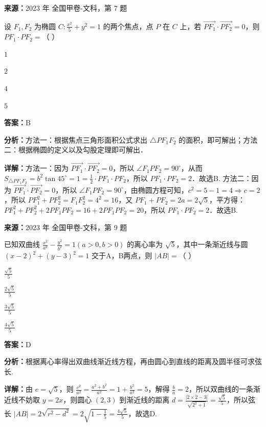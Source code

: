 \begin{question}[points=5]
\textbf{来源：}2023 年 全国甲卷-文科，第 7 题\par
设 $F_1, F_2$ 为椭圆 $C: \frac{x^2}{5}+y^2=1$ 的两个焦点，点 $P$ 在 $C$ 上，若 $\overrightarrow{PF_1} \cdot \overrightarrow{PF_2}=0$，则 $PF_1 \cdot PF_2 =$（    ）
\begin{choices}
  \item $1$
  \item $2$
  \item $4$
  \item $5$
\end{choices}
\begin{solution}
\textbf{答案：}B

\textbf{分析：}方法一：根据焦点三角形面积公式求出 $\triangle PF_1F_2$ 的面积，即可解出；方法二：根据椭圆的定义以及勾股定理即可解出．

\textbf{详解：}方法一：因为 $\overrightarrow{PF_1} \cdot \overrightarrow{PF_2}=0$，所以 $\angle F_1PF_2=90^\circ$，从而 $S_{\triangle PF_1F_2} = b^2\tan45^\circ = 1 = \frac{1}{2} \cdot PF_1 \cdot PF_2$，所以 $PF_1 \cdot PF_2 = 2$．故选B.
方法二：因为 $\overrightarrow{PF_1} \cdot \overrightarrow{PF_2}=0$，所以 $\angle F_1PF_2=90^\circ$，由椭圆方程可知，$c^2=5-1=4 \Rightarrow c=2$，所以 $PF_1^2+PF_2^2 = F_1F_2^2 = 4^2=16$，又 $PF_1+PF_2=2a=2\sqrt{5}$，平方得：$PF_1^2+PF_2^2+2PF_1PF_2=16+2PF_1PF_2=20$，所以 $PF_1 \cdot PF_2=2$．故选B.
\end{solution}
\end{question}

\begin{question}[points=5]
\textbf{来源：}2023 年 全国甲卷-文科，第 9 题\par
已知双曲线 $\frac{x^2}{a^2}-\frac{y^2}{b^2}=1(a>0,b>0)$ 的离心率为 $\sqrt{5}$，其中一条渐近线与圆 $(x-2)^2+(y-3)^2=1$ 交于A，B两点，则 $|AB| =$（    ）
\begin{choices}
  \item $\frac{\sqrt{5}}{5}$
  \item $\frac{2\sqrt{5}}{5}$
  \item $\frac{3\sqrt{5}}{5}$
  \item $\frac{4\sqrt{5}}{5}$
\end{choices}
\begin{solution}
\textbf{答案：}D

\textbf{分析：}根据离心率得出双曲线渐近线方程，再由圆心到直线的距离及圆半径可求弦长.

\textbf{详解：}由 $e=\sqrt{5}$，则 $\frac{c^2}{a^2}= \frac{a^2+b^2}{a^2}=1+\frac{b^2}{a^2}=5$，解得 $\frac{b}{a}=2$，所以双曲线的一条渐近线不妨取 $y=2x$，则圆心 $(2,3)$ 到渐近线的距离 $d = \frac{|2\times2-3|}{\sqrt{2^2+1}} = \frac{\sqrt{5}}{5}$，所以弦长 $|AB| = 2\sqrt{r^2-d^2} = 2\sqrt{1-\frac{1}{5}} = \frac{4\sqrt{5}}{5}$，故选D.
\end{solution}
\end{question}

